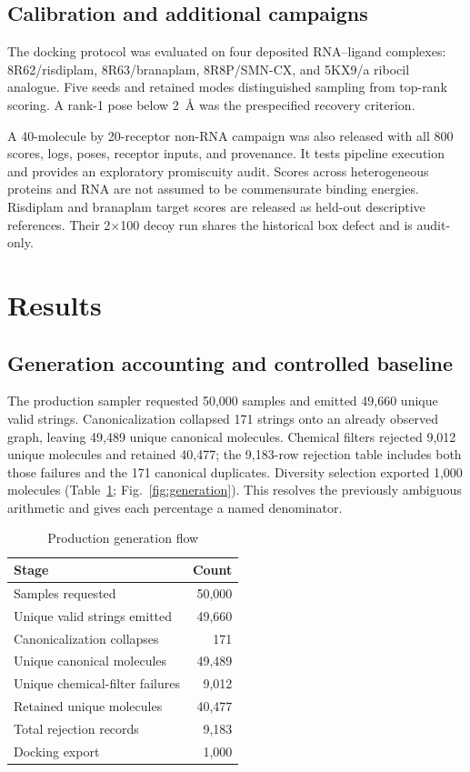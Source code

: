 \documentclass[journal]{IEEEtran}
\begin{document}
\subsection{Calibration and additional campaigns}

The docking protocol was evaluated on four deposited RNA--ligand
complexes: 8R62/risdiplam, 8R63/branaplam, 8R8P/SMN-CX, and 5KX9/a
ribocil analogue. Five seeds and retained modes distinguished sampling
from top-rank scoring. A rank-1 pose below 2~\AA{} was the prespecified
recovery criterion.

A 40-molecule by 20-receptor non-RNA campaign was also released with
all 800 scores, logs, poses, receptor inputs, and provenance. It tests
pipeline execution and provides an exploratory promiscuity audit.
Scores across heterogeneous proteins and RNA are not assumed to be
commensurate binding energies. Risdiplam and branaplam target scores are
released as held-out descriptive references. Their 2$\times$100 decoy
run shares the historical box defect and is audit-only.

\section{Results}

\subsection{Generation accounting and controlled baseline}

The production sampler requested 50,000 samples and emitted 49,660
unique valid strings. Canonicalization collapsed 171 strings onto an
already observed graph, leaving 49,489 unique canonical molecules.
Chemical filters rejected 9,012 unique molecules and retained 40,477;
the 9,183-row rejection table includes both those failures and the 171
canonical duplicates. Diversity selection exported 1,000 molecules
(Table~\ref{tab:generation}; Fig.~\ref{fig:generation}). This resolves
the previously ambiguous arithmetic and gives each percentage a named
denominator.

\begin{table}[!t]
\caption{Production generation flow}
\label{tab:generation}
\centering
\footnotesize
\begin{tabular}{lr}
\toprule
Stage & Count \\
\midrule
Samples requested & 50,000 \\
Unique valid strings emitted & 49,660 \\
Canonicalization collapses & 171 \\
Unique canonical molecules & 49,489 \\
Unique chemical-filter failures & 9,012 \\
Retained unique molecules & 40,477 \\
Total rejection records & 9,183 \\
Docking export & 1,000 \\
\bottomrule
\end{tabular}
\end{table}
\end{document}
